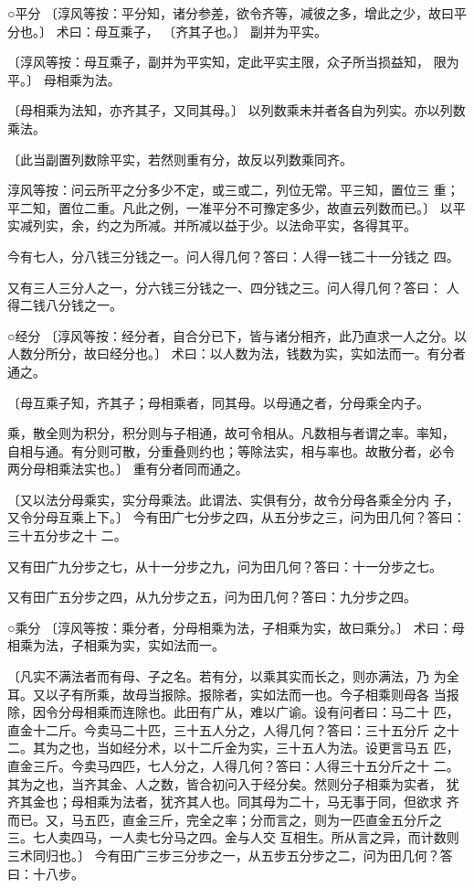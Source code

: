 \documentclass[a4paper,12pt,UTF8,twoside]{ctexbook}
\begin{document}
○平分 〔淳风等按：平分知，诸分参差，欲令齐等，减彼之多，增此之少，故曰平 分也。〕 术曰：母互乘子， 〔齐其子也。〕 副并为平实。

〔淳风等按：母互乘子，副并为平实知，定此平实主限，众子所当损益知， 限为平。〕 母相乘为法。

〔母相乘为法知，亦齐其子，又同其母。〕 以列数乘未并者各自为列实。亦以列数乘法。

〔此当副置列数除平实，若然则重有分，故反以列数乘同齐。

淳风等按：问云所平之分多少不定，或三或二，列位无常。平三知，置位三 重；平二知，置位二重。凡此之例，一准平分不可豫定多少，故直云列数而已。〕 以平实减列实，余，约之为所减。并所减以益于少。以法命平实，各得其平。

今有七人，分八钱三分钱之一。问人得几何？答曰：人得一钱二十一分钱之 四。

又有三人三分人之一，分六钱三分钱之一、四分钱之三。问人得几何？答曰： 人得二钱八分钱之一。

○经分 〔淳风等按：经分者，自合分已下，皆与诸分相齐，此乃直求一人之分。以 人数分所分，故曰经分也。〕 术曰：以人数为法，钱数为实，实如法而一。有分者通之。

〔母互乘子知，齐其子；母相乘者，同其母。以母通之者，分母乘全内子。

乘，散全则为积分，积分则与子相通，故可令相从。凡数相与者谓之率。率知， 自相与通。有分则可散，分重叠则约也；等除法实，相与率也。故散分者，必令 两分母相乘法实也。〕 重有分者同而通之。

〔又以法分母乘实，实分母乘法。此谓法、实俱有分，故令分母各乘全分内 子，又令分母互乘上下。〕 今有田广七分步之四，从五分步之三，问为田几何？答曰：三十五分步之十 二。

又有田广九分步之七，从十一分步之九，问为田几何？答曰：十一分步之七。

又有田广五分步之四，从九分步之五，问为田几何？答曰：九分步之四。

○乘分 〔淳风等按：乘分者，分母相乘为法，子相乘为实，故曰乘分。〕 术曰：母相乘为法，子相乘为实，实如法而一。

〔凡实不满法者而有母、子之名。若有分，以乘其实而长之，则亦满法，乃 为全耳。又以子有所乘，故母当报除。报除者，实如法而一也。今子相乘则母各 当报除，因令分母相乘而连除也。此田有广从，难以广谕。设有问者曰：马二十 匹，直金十二斤。今卖马二十匹，三十五人分之，人得几何？答曰：三十五分斤 之十二。其为之也，当如经分术，以十二斤金为实，三十五人为法。设更言马五 匹，直金三斤。今卖马四匹，七人分之，人得几何？答曰：人得三十五分斤之十 二。其为之也，当齐其金、人之数，皆合初问入于经分矣。然则分子相乘为实者， 犹齐其金也；母相乘为法者，犹齐其人也。同其母为二十，马无事于同，但欲求 齐而已。又，马五匹，直金三斤，完全之率；分而言之，则为一匹直金五分斤之 三。七人卖四马，一人卖七分马之四。金与人交 互相生。所从言之异，而计数则 三术同归也。〕 今有田广三步三分步之一，从五步五分步之二，问为田几何？答曰：十八步。
\end{document}
